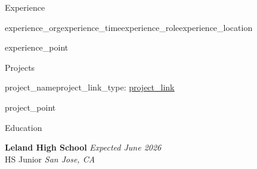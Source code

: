 \documentclass[
	11pt, %
]{tex/resume} %
\begin{document}

\begin{rSection}{Experience}

	\begin{rSubsection}{{{experience_org}}}{{{experience_time}}}{{{experience_role}}}{{{experience_location}}}
		\item {{experience_point}}   
	\end{rSubsection}


\end{rSection}


\begin{rSection}{Projects}

	\begin{rSubsection}{{{project_name}}}{}{{{project_link_type}}: \underline{\href{{{project_link}}}{{{project_link}}}}}{}
		\item {{project_point}}
	\end{rSubsection}


\end{rSection}


\begin{rSection}{Education}
	
	\textbf{Leland High School} \hfill \textit{Expected June 2026} \\ 
	HS Junior \hfill \textit{San Jose, CA}
	
\end{rSection}

\end{document}
